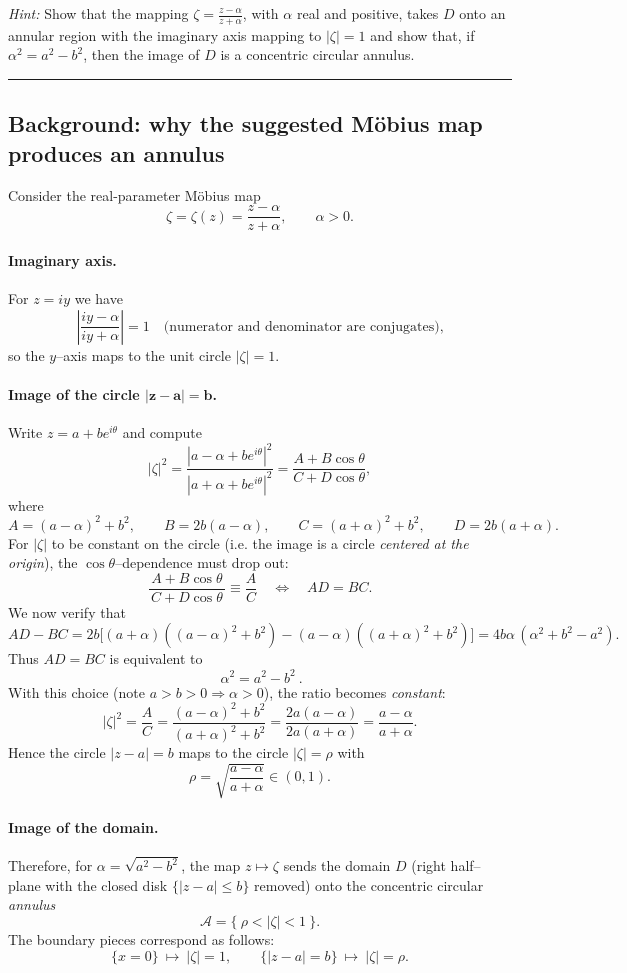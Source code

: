 \documentclass[11pt]{article}
\begin{document}
	\medskip
	\noindent\textit{Hint:} Show that the mapping $\displaystyle \zeta=\frac{z-\alpha}{z+\alpha}$, with $\alpha$ real and positive,
	takes $D$ onto an annular region with the imaginary axis mapping to $|\zeta|=1$ and show that, if $\alpha^{2}=a^{2}-b^{2}$, then the image of $D$ is a concentric circular annulus.
	
	\bigskip\hrule\bigskip
	
	\subsection*{Background: why the suggested Möbius map produces an annulus}
	Consider the real-parameter Möbius map
	\[
	\zeta=\zeta(z)=\frac{z-\alpha}{z+\alpha}, \qquad \alpha>0.
	\]
	\paragraph{Imaginary axis.}
	For $z=iy$ we have
	\[
	\left|\frac{iy-\alpha}{iy+\alpha}\right|=1 \quad\text{(numerator and denominator are conjugates),}
	\]
	so the $y$–axis maps to the unit circle $|\zeta|=1$.
	
	\paragraph{Image of the circle $\boldsymbol{|z-a|=b}$.}
	Write $z=a+be^{i\theta}$ and compute
	\[
	|\zeta|^{2}
	=\frac{|a-\alpha+be^{i\theta}|^{2}}{|a+\alpha+be^{i\theta}|^{2}}
	=\frac{A+B\cos\theta}{C+D\cos\theta},
	\]
	where
	\[
	A=(a-\alpha)^{2}+b^{2}, \qquad B=2b(a-\alpha), \qquad
	C=(a+\alpha)^{2}+b^{2}, \qquad D=2b(a+\alpha).
	\]
	For $|\zeta|$ to be constant on the circle (i.e. the image is a circle \emph{centered at the origin}),
	the $\cos\theta$–dependence must drop out:
	\[
	\frac{A+B\cos\theta}{\,C+D\cos\theta\,}\equiv\frac{A}{C}
	\quad\Longleftrightarrow\quad AD=BC.
	\]
	We now verify that
	\[
	AD-BC
	=2b\Big[(a+\alpha)((a-\alpha)^{2}+b^{2})-(a-\alpha)((a+\alpha)^{2}+b^{2})\Big]
	=4b\alpha\,(\alpha^{2}+b^{2}-a^{2}).
	\]
	Thus $AD=BC$ is equivalent to
	\[
	\boxed{\ \alpha^{2}=a^{2}-b^{2}\ }.
	\]
	With this choice (note $a>b>0\Rightarrow \alpha>0$), the ratio becomes \emph{constant}:
	\[
	|\zeta|^{2}=\frac{A}{C}
	=\frac{(a-\alpha)^{2}+b^{2}}{(a+\alpha)^{2}+b^{2}}
	=\frac{2a(a-\alpha)}{2a(a+\alpha)}
	=\frac{a-\alpha}{a+\alpha}.
	\]
	Hence the circle $|z-a|=b$ maps to the circle $|\zeta|=\rho$ with
	\[
	\boxed{\ \rho=\sqrt{\frac{a-\alpha}{a+\alpha}}\in(0,1). \ }
	\]
	
	\paragraph{Image of the domain.}
	Therefore, for $\alpha=\sqrt{a^{2}-b^{2}}$, the map $z\mapsto\zeta$ sends the domain $D$
	(right half–plane with the closed disk $\{|z-a|\le b\}$ removed) onto the concentric circular \emph{annulus}
	\[
	\mathcal A=\{\ \rho<|\zeta|<1\ \}.
	\]
	The boundary pieces correspond as follows:
	\[
	\{x=0\}\ \longmapsto\ |\zeta|=1,
	\qquad
	\{|z-a|=b\}\ \longmapsto\ |\zeta|=\rho.
	\]
	
\end{document}
